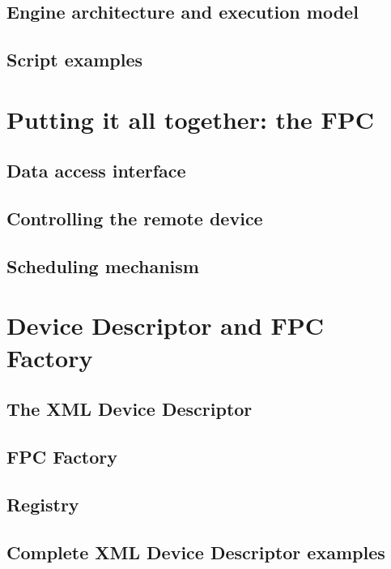 \subsection{Engine architecture and execution model}

\subsection{Script examples}


\section{Putting it all together: the FPC}

\subsection{Data access interface}

\subsection{Controlling the remote device}

\subsection{Scheduling mechanism}


\section{Device Descriptor and FPC Factory}

\subsection{The XML Device Descriptor}

\subsection{FPC Factory}

\subsection{Registry}

\subsection{Complete XML Device Descriptor examples}